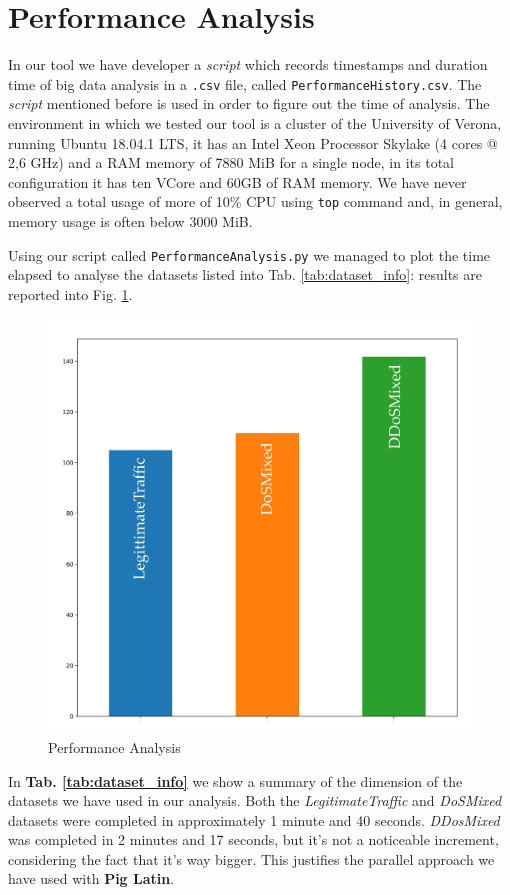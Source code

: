 \section{Performance Analysis}
\label{sec:perfanalysis}
In our tool we have developer a \textit{script} which records timestamps and duration time of big data analysis in a \texttt{.csv} file, called \texttt{PerformanceHistory.csv}. The \textit{script} mentioned before is used in order to figure out the time of analysis. 
The environment in which we tested our tool is a cluster of the University of Verona, running Ubuntu 18.04.1 LTS, it has an Intel Xeon Processor Skylake (4 cores @ 2,6 GHz) and a RAM memory of 7880 MiB for a single node, in its total configuration it has ten VCore and 60GB of RAM memory. 
We have never observed a total usage of more of 10\% CPU using \texttt{top} command and, in general, memory usage is often below 3000 MiB.
 
Using our script called \texttt{PerformanceAnalysis.py} we managed to plot the time elapsed to analyse the datasets listed into Tab. \ref{tab:dataset_info}: results are reported into Fig. \ref{fig:analysis_stats}. 

\begin{figure}[ht]
	\centering
	\includegraphics[scale=0.25]{imgs/analysis_stat.png}
	\caption{Performance Analysis} 
	\label{fig:analysis_stats}
\end{figure}
In \textbf{Tab. \ref{tab:dataset_info}} we show a summary of the dimension of the datasets we have used in our analysis. Both the \textit{LegitimateTraffic} and \textit{DoSMixed} datasets were completed in approximately 1 minute and 40 seconds. \textit{DDosMixed} was completed in 2 minutes and 17 seconds, but it's not a noticeable increment, considering the fact that it's way bigger. This justifies the parallel approach we have used with \textbf{Pig Latin}.

